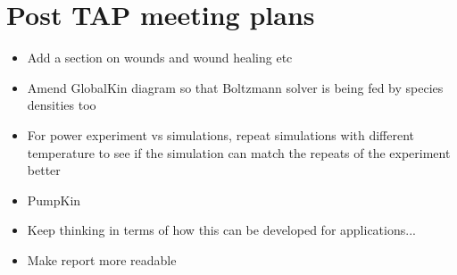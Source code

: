 \documentclass[11pt, oneside]{article}   	%
\begin{document}
%
%
%


\section{Post TAP meeting plans}

\begin{itemize}
\item Add a section on wounds and wound healing etc
\item Amend GlobalKin diagram so that Boltzmann solver is being fed by species densities too
\item For power experiment vs simulations, repeat simulations with different temperature to see if the simulation can match the repeats of the experiment better
\item PumpKin
\item Keep thinking in terms of how this can be developed for applications...
\item Make report more readable
\end{itemize}




\end{document}
